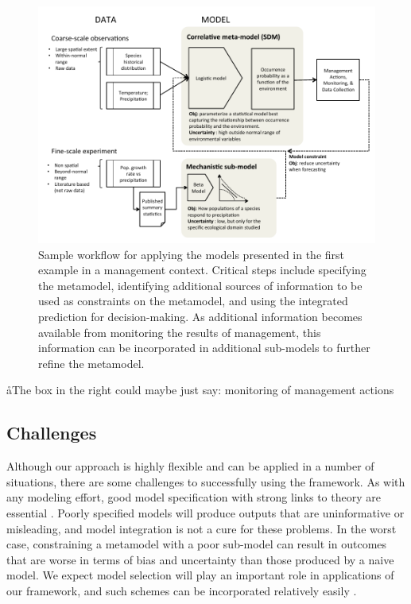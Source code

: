 
\begin{figure}[tb]
	\includegraphics{management.pdf}
	\caption{Sample workflow for applying the models presented in the first example in a management context.
	Critical steps include specifying the metamodel, identifying additional sources of information to be used as constraints on the metamodel, and using the integrated prediction for decision-making.
	As additional information becomes available from monitoring the results of management, this information can be incorporated in additional sub-models to further refine the metamodel.}
	\label{fig:adaptive_management}
\end{figure}

\aa{The box in the right could maybe just say: monitoring of management actions}


\subsection*{Challenges} 
Although our approach is highly flexible and can be applied in a number of situations, there are some challenges to successfully using the framework.
As with any modeling effort, good model specification with strong links to theory are essential \citep{Austin2007}.
Poorly specified models will produce outputs that are uninformative or misleading, and model integration is not a cure for these problems.
In the worst case, constraining a metamodel with a poor sub-model can result in outcomes that are worse in terms of bias and uncertainty than those produced by a naive model.
We expect model selection will play an important role in applications of our framework, and such schemes can be incorporated relatively easily \citep{Madigan1995, Wasserman2000, Tenan2014}.

